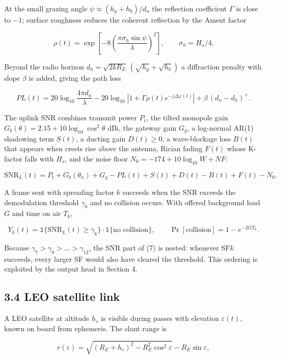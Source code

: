 \documentclass[
  11pt,
]{article}
\begin{document}
At the small grazing angle \(\psi\approx(h_g+h_b)/d_n\) the reflection
coefficient \(\Gamma\) is close to \(-1\); surface roughness reduces the
coherent reflection by the Ament factor

\[\rho(t)=\exp\!\left[-8\left(\frac{\pi\sigma_h\sin\psi}{\lambda}\right)^2\right],\qquad \sigma_h=H_s/4. \tag{4}\]

Beyond the radio horizon \(d_h=\sqrt{2kR_E}\,(\sqrt{h_g}+\sqrt{h_b})\) a
diffraction penalty with slope \(\beta\) is added, giving the path loss

\[PL(t)=20\log_{10}\frac{4\pi d_n}{\lambda}-20\log_{10}\left|1+\Gamma\rho(t)e^{-j\Delta\varphi(t)}\right|+\beta\,(d_n-d_h)^{+}. \tag{5}\]

The uplink SNR combines transmit power \(P_t\), the tilted monopole gain
\(G_b(\theta)=2.15+10\log_{10}\cos^2\theta\) dBi, the gateway gain
\(G_g\), a log-normal AR(1) shadowing term \(S(t)\), a ducting gain
\(D(t)\ge 0\), a wave-blockage loss \(B(t)\) that appears when crests
rise above the antenna, Rician fading \(F(t)\) whose K-factor falls with
\(H_s\), and the noise floor \(N_0=-174+10\log_{10}W+NF\):

\[\mathrm{SNR}_L(t)=P_t+G_b(\theta_n)+G_g-PL(t)+S(t)+D(t)-B(t)+F(t)-N_0. \tag{6}\]

A frame sent with spreading factor \(k\) succeeds when the SNR exceeds
the demodulation threshold \(\gamma_k\) and no collision occurs. With
offered background load \(G\) and time on air \(T_k\),

\[Y_k(t)=\mathbb{1}\{\mathrm{SNR}_L(t)\ge\gamma_k\}\cdot\mathbb{1}\{\text{no collision}\},\qquad \Pr[\text{collision}]=1-e^{-2GT_k}. \tag{7}\]

Because \(\gamma_7>\gamma_8>\dots>\gamma_{12}\), the SNR part of (7) is
nested: whenever SF\(k\) succeeds, every larger SF would also have
cleared the threshold. This ordering is exploited by the output head in
Section 4.

\hypertarget{leo-satellite-link}{%
\subsection{3.4 LEO satellite link}\label{leo-satellite-link}}

A LEO satellite at altitude \(h_s\) is visible during passes with
elevation \(\varepsilon(t)\), known on board from ephemeris. The slant
range is

\[r(\varepsilon)=\sqrt{(R_E+h_s)^2-R_E^2\cos^2\varepsilon}-R_E\sin\varepsilon, \tag{8}\]
\end{document}

